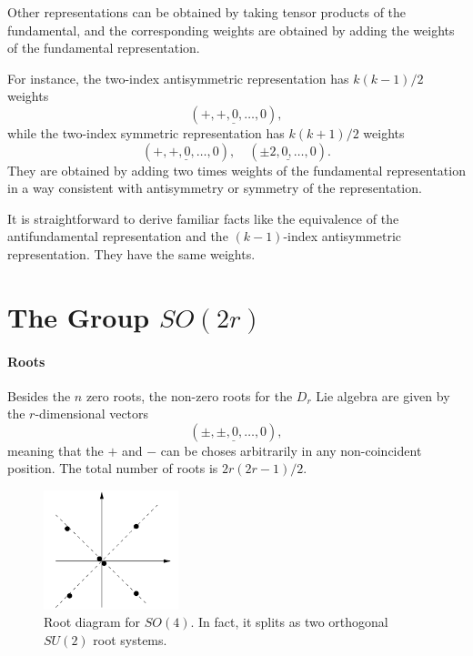 Other representations can be obtained by taking tensor products of the
fundamental, and the corresponding weights are obtained by adding the weights of the fundamental representation.

For instance, the two-index antisymmetric representation has $k(k-1)/2$ weights
\begin{equation}
    (\underline{+,+,0,\dots,0}),
\end{equation}
while the two-index symmetric representation has $k(k+ 1)/2$ weights
\begin{equation}
    (\underline{+,+,0,\dots,0}), \quad (\underline{\pm 2, 0, \dots, 0}).
\end{equation}
They are obtained by adding two times weights of the fundamental representation in a way consistent with antisymmetry or symmetry of the representation.

It is straightforward to derive familiar facts like the equivalence of the antifundamental representation and the $(k-1)$-index antisymmetric representation. They have the same weights.


\section{The Group \texorpdfstring{$SO(2r)$}{SO(2r)}}
\paragraph{Roots}
Besides the $n$ zero roots, the non-zero roots for the $D_r$ Lie algebra are given by the $r$-dimensional vectors
\begin{equation}
    (\underline{\pm,\pm,0,\dots,0}),
\end{equation}
meaning that the $+$ and $-$ can be choses arbitrarily in any non-coincident position. The total number of roots is $2r(2r-1)/2$.

\begin{figure}
    \centering
    \includegraphics[width=0.35\textwidth]{figures/so4-root-system.png}
    \caption{ Root diagram for $SO(4)$. In fact, it splits as two orthogonal $SU(2)$ root systems.}
    \label{fig:so4-root-system}
\end{figure}

